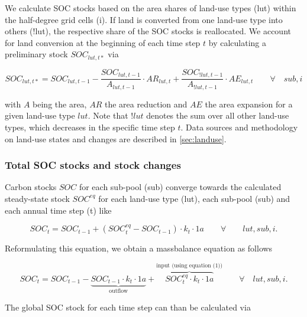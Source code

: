 \documentclass[gc, manuscript]{copernicus}
\begin{document}
We calculate SOC stocks based on the area shares of land-use types (lut) within the half-degree grid cells (i). If land is converted from one land-use type into others (!lut), the respective share of the SOC stocks is reallocated. We account for land conversion at the beginning of each time step \(t\) by calculating a preliminary stock \(SOC_{lut,t*}\) via

\begin{equation}
SOC_{lut,t*} = SOC_{lut,t-1} - \frac{SOC_{lut,t-1}}{A_{lut,t-1}} \cdot  AR_{lut,t} + \frac{SOC_{!lut,t-1}}{A_{!lut,t-1}} \cdot  AE_{lut,t} \qquad \forall\quad sub, i  
\label{eq:ctransfer}
\end{equation}

with \(A\) being the area, \(AR\) the area reduction and \(AE\) the area expansion for a given land-use type \(lut\). Note that \(!lut\) denotes the sum over all other land-use types, which decreases in the specific time step \(t\). Data sources and methodology on land-use states and changes are described in \ref{sec:landuse}.

\hypertarget{total-soc-stocks-and-stock-changes}{%
\subsubsection{Total SOC stocks and stock changes}\label{total-soc-stocks-and-stock-changes}}

Carbon stocks \(SOC\) for each sub-pool (sub) converge towards the calculated steady-state stock \(SOC^{eq}\) for each land-use type (lut), each sub-pool (sub) and each annual time step (t) like

\begin{equation}
SOC_{t} = SOC_{t-1} + (SOC^{eq}_{t} - SOC_{t-1}) \cdot k_{t} \cdot 1\unit{a} \qquad \forall\quad\quad lut, sub, i.
\label{eq:SOCstate}
\end{equation}

Reformulating this equation, we obtain a massbalance equation as follows

\begin{equation}
SOC_{t} = SOC_{t-1} - \underbrace{SOC_{t-1} \cdot k_{t} \cdot 1\unit{a}}_{\text{outflow}} + \overbrace{SOC^{eq}_{t} \cdot k_{t} \cdot 1\unit{a}}^{\text{input (using equation (1))}}  \qquad \forall\quad lut, sub, i.
\label{eq:steadystate2budget}
\end{equation}

The global SOC stock for each time step can than be calculated via
\end{document}
